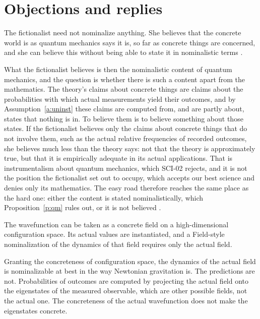 \documentclass{situationist-preprint}
\begin{document}
\section{Objections and replies}

\begin{objection}
The fictionalist need not nominalize anything. She believes that the concrete world is as quantum mechanics says it is, so far as concrete things are concerned, and she can believe this without being able to state it in nominalistic terms \citep{Melia2000,Balaguer1998,Leng2010}.
\end{objection}

\begin{reply}
What the fictionalist believes is then the nominalistic content of quantum mechanics, and the question is whether there is such a content apart from the mathematics. The theory's claims about concrete things are claims about the probabilities with which actual measurements yield their outcomes, and by Assumption~\ref{a:uninst} these claims are computed from, and are partly about, states that nothing is in. To believe them is to believe something about those states. If the fictionalist believes only the claims about concrete things that do not involve them, such as the actual relative frequencies of recorded outcomes, she believes much less than the theory says: not that the theory is approximately true, but that it is empirically adequate in its actual applications. That is instrumentalism about quantum mechanics, which SCI-02 rejects, and it is not the position the fictionalist set out to occupy, which accepts our best science and denies only its mathematics. The easy road therefore reaches the same place as the hard one: either the content is stated nominalistically, which Proposition~\ref{p:qm} rules out, or it is not believed \citep{Colyvan2010}.
\end{reply}

\begin{objection}
The wavefunction can be taken as a concrete field on a high-dimensional configuration space. Its actual values are instantiated, and a Field-style nominalization of the dynamics of that field requires only the actual field.
\end{objection}

\begin{reply}
Granting the concreteness of configuration space, the dynamics of the actual field is nominalizable at best in the way Newtonian gravitation is. The predictions are not. Probabilities of outcomes are computed by projecting the actual field onto the eigenstates of the measured observable, which are other possible fields, not the actual one. The concreteness of the actual wavefunction does not make the eigenstates concrete.
\end{reply}
\end{document}
